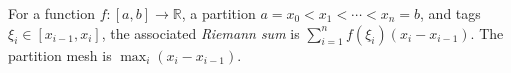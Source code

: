 
For a function $f:[a,b]\to\mathbb R$, a partition $a=x_0<x_1<\cdots<x_n=b$, and tags $\xi_i\in[x_{i-1},x_i]$, the associated \emph{Riemann sum} is $\sum_{i=1}^{n}f(\xi_i)(x_i-x_{i-1})$. The partition mesh is $\max_i(x_i-x_{i-1})$.
